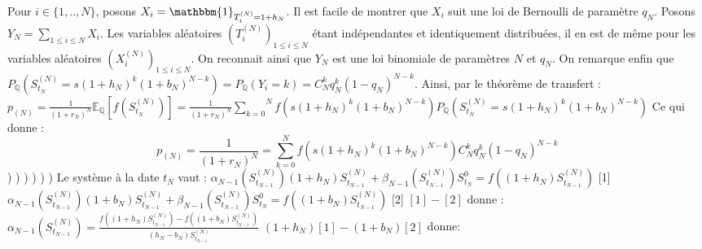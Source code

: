 \documentclass{exam}
\begin{document}
Pour $i \in \{1,..,N\}$, posons $X_i=\mathbbm{1}_{T_i^{(N)}=1+h_N}$. Il est facile de montrer que $X_i$ suit une loi de Bernoulli de paramètre $q_N$. Posons $Y_N=\underset{1 \leq i \leq N }{\sum}X_i$. Les variables aléatoires $(T_i^{(N)})_{1 \leq i \leq N}$ étant indépendantes et identiquement distribuées, il en est de même pour les variables aléatoires $(X_i^{(N)})_{1 \leq i \leq N}$. On reconnait ainsi que $Y_N$ est une loi binomiale de paramètres $N$ et $q_N$. On remarque enfin que $P_{\mathbb{Q}}(S_{t_N}^{(N)}=s(1+h_N)^k(1+b_N)^{N-k})=P_{\mathbb{Q}}(Y_i=k)=C_N^k q_N^k (1-q_N)^{N-k}$. Ainsi, par le théorème de transfert :
\newline
\espace
$p_{(N)}=\frac{1}{(1+r_N)^N}\mathbb{E}_{\mathbb{Q}}[f(S_{t_N}^{(N)})]=\frac{1}{(1+r_N)^N}\overset{N}{\underset{k=0}{\sum}}f(s(1+h_N)^k(1+b_N)^{N-k})P_{\mathbb{Q}}(S_{t_N}^{(N)}=s(1+h_N)^k(1+b_N)^{N-k})$
\newline
\espace
Ce qui donne :
$$\boxed{p_{(N)}=\frac{1}{(1+r_N)^N}=\overset{N}{\underset{k=0}{\sum}}f(s(1+h_N)^k(1+b_N)^{N-k})C_N^k q_N^k (1-q_N)^{N-k}}$$
\newline
{}) 
\newline
{})
\newline
{})
\newline
{})
\newline
{})
\newline
{}) Le système à la date $t_N$ vaut :
\newline
\vspace{0.5cm}
$\alpha_{N-1}(S_{t_{N-1}}^{(N)})(1 + h_N)S_{t_{N-1}}^{(N)} + \beta_{N-1}(S_{t_{N-1}}^{(N)})S_{t_N}^{0} = f((1+h_N)S_{t_{N-1}}^{(N)})$ \hspace{1cm} [1]
\newline
\vspace{0.5cm}
$\alpha_{N-1}(S_{t_{N-1}}^{(N)})(1+b_N)S_{t_{N-1}}^{(N)} + \beta_{N-1}(S_{t_{N-1}}^{(N)})S_{t_N}^{0} = f((1+b_N)S_{t_{N-1}}^{(N)})$ \hspace{1cm} [2]
\newline
\vspace{0.5cm}
$[1]-[2]$ donne :
\newline
\vspace{0.5cm}
$\alpha_{N-1}(S_{t_{N-1}}^{(N)})=\frac{f((1+h_N)S_{t_{N-1}}^{(N)})-f((1+b_N)S_{t_{N-1}}^{(N)})}{(h_N-b_N)S_{t_{N-1}}^{(N)}}$
\newline
\vspace{0.5cm}
$(1+h_N)[1]-(1+b_N)[2]$ donne:
\newline
\end{document}
